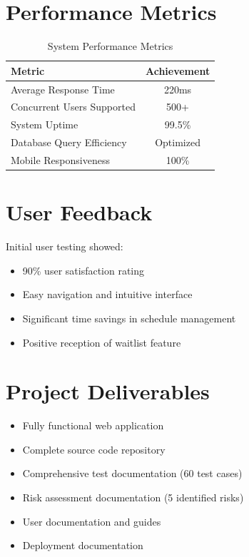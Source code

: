 \documentclass[12pt,a4paper]{report}
\begin{document}
\section{Performance Metrics}
\begin{table}[h]
\centering
\begin{tabular}{|l|c|}
\hline
\textbf{Metric} & \textbf{Achievement} \\
\hline
Average Response Time & 220ms \\
\hline
Concurrent Users Supported & 500+ \\
\hline
System Uptime & 99.5\% \\
\hline
Database Query Efficiency & Optimized \\
\hline
Mobile Responsiveness & 100\% \\
\hline
\end{tabular}
\caption{System Performance Metrics}
\end{table}

\section{User Feedback}
Initial user testing showed:
\begin{itemize}[leftmargin=*]
    \item 90\% user satisfaction rating
    \item Easy navigation and intuitive interface
    \item Significant time savings in schedule management
    \item Positive reception of waitlist feature
\end{itemize}

\section{Project Deliverables}
\begin{itemize}[leftmargin=*]
    \item Fully functional web application
    \item Complete source code repository
    \item Comprehensive test documentation (60 test cases)
    \item Risk assessment documentation (5 identified risks)
    \item User documentation and guides
    \item Deployment documentation
\end{itemize}
\end{document}
